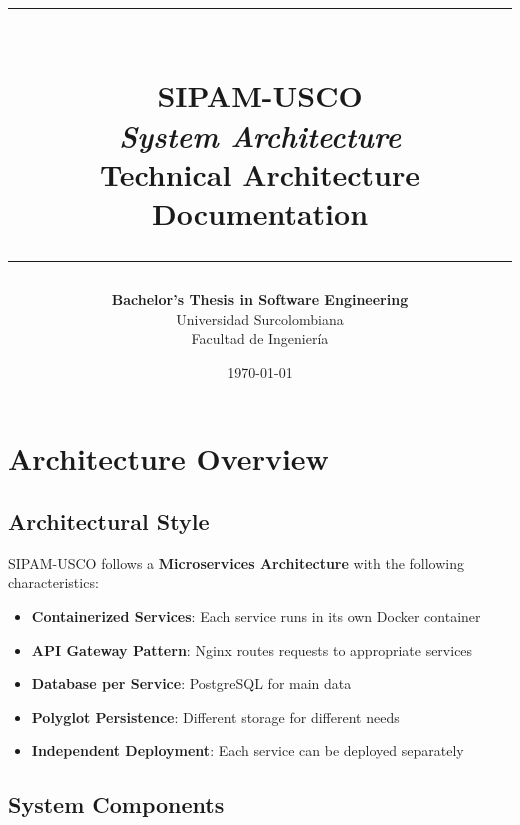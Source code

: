 \documentclass[12pt,a4paper]{report}
\title{
    \vspace{-1cm}
    \textcolor{uscoRed}{\rule{\textwidth}{2pt}}\\[0.5cm]
    \textbf{\Huge SIPAM-USCO}\\[0.3cm]
    \Large \textit{System Architecture}\\[0.3cm]
    \LARGE Technical Architecture Documentation\\[0.5cm]
    \textcolor{uscoRed}{\rule{\textwidth}{2pt}}
}
\author{
    \textbf{Bachelor's Thesis in Software Engineering}\\[0.3cm]
    Universidad Surcolombiana\\
    Facultad de Ingeniería
}
\date{\today}
\begin{document}
\maketitle

\tableofcontents
\listoffigures

\chapter{Architecture Overview}

\section{Architectural Style}

SIPAM-USCO follows a \textbf{Microservices Architecture} with the following characteristics:

\begin{itemize}
    \item \textbf{Containerized Services}: Each service runs in its own Docker container
    \item \textbf{API Gateway Pattern}: Nginx routes requests to appropriate services
    \item \textbf{Database per Service}: PostgreSQL for main data
    \item \textbf{Polyglot Persistence}: Different storage for different needs
    \item \textbf{Independent Deployment}: Each service can be deployed separately
\end{itemize}

\section{System Components}
\end{document}
